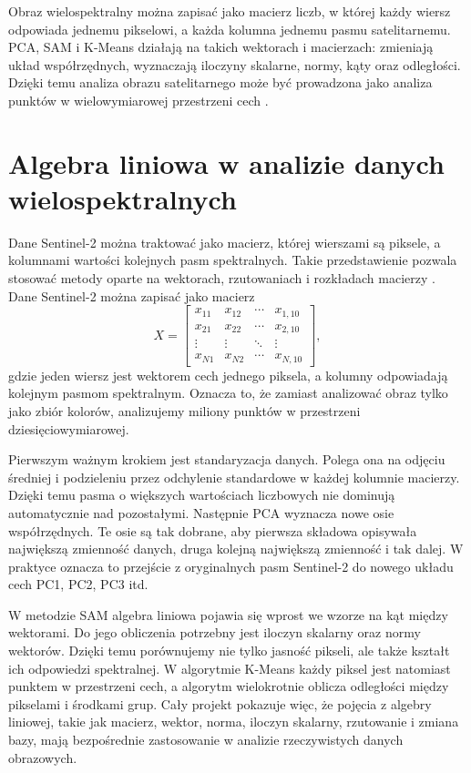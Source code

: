 \documentclass[12pt,a4paper]{article}
\begin{document}
	Obraz wielospektralny można zapisać jako macierz liczb, w której każdy wiersz odpowiada jednemu pikselowi, a każda kolumna jednemu pasmu satelitarnemu. PCA, SAM i K-Means działają na takich wektorach i macierzach: zmieniają układ współrzędnych, wyznaczają iloczyny skalarne, normy, kąty oraz odległości. Dzięki temu analiza obrazu satelitarnego może być prowadzona jako analiza punktów w wielowymiarowej przestrzeni cech \cite{blum2020foundations,nag2019filters}.

	\section{Algebra liniowa w analizie danych wielospektralnych}
	\label{sec:algebra}

	Dane Sentinel-2 można traktować jako macierz, której wierszami są piksele, a kolumnami wartości kolejnych pasm spektralnych. Takie przedstawienie pozwala stosować metody oparte na wektorach, rzutowaniach i rozkładach macierzy \cite{blum2020foundations}. Dane Sentinel-2 można zapisać jako macierz
	\[
	X =
	\begin{bmatrix}
	x_{11} & x_{12} & \cdots & x_{1,10}\\
	x_{21} & x_{22} & \cdots & x_{2,10}\\
	\vdots & \vdots & \ddots & \vdots\\
	x_{N1} & x_{N2} & \cdots & x_{N,10}
	\end{bmatrix},
	\]
	gdzie jeden wiersz jest wektorem cech jednego piksela, a kolumny odpowiadają kolejnym pasmom spektralnym. Oznacza to, że zamiast analizować obraz tylko jako zbiór kolorów, analizujemy miliony punktów w przestrzeni dziesięciowymiarowej.

	Pierwszym ważnym krokiem jest standaryzacja danych. Polega ona na odjęciu średniej i podzieleniu przez odchylenie standardowe w każdej kolumnie macierzy. Dzięki temu pasma o większych wartościach liczbowych nie dominują automatycznie nad pozostałymi. Następnie PCA wyznacza nowe osie współrzędnych. Te osie są tak dobrane, aby pierwsza składowa opisywała największą zmienność danych, druga kolejną największą zmienność i tak dalej. W praktyce oznacza to przejście z oryginalnych pasm Sentinel-2 do nowego układu cech PC1, PC2, PC3 itd.

	W metodzie SAM algebra liniowa pojawia się wprost we wzorze na kąt między wektorami. Do jego obliczenia potrzebny jest iloczyn skalarny oraz normy wektorów. Dzięki temu porównujemy nie tylko jasność pikseli, ale także kształt ich odpowiedzi spektralnej. W algorytmie K-Means każdy piksel jest natomiast punktem w przestrzeni cech, a algorytm wielokrotnie oblicza odległości między pikselami i środkami grup. Cały projekt pokazuje więc, że pojęcia z algebry liniowej, takie jak macierz, wektor, norma, iloczyn skalarny, rzutowanie i zmiana bazy, mają bezpośrednie zastosowanie w analizie rzeczywistych danych obrazowych.
	
\end{document}
